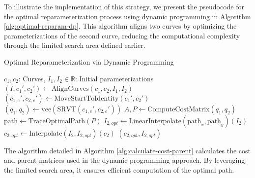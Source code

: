 To illustrate the implementation of this strategy, we present the pseudocode for the optimal reparameterization process using dynamic programming in Algorithm \ref{alg:optimal-reparam-dp}. This algorithm aligns two curves by optimizing the parameterizations of the second curve, reducing the computational complexity through the limited search area defined earlier.

\begin{algorithm}
    \caption{Optimal Reparameterization via Dynamic Programming}
    \label{alg:optimal-reparam-dp}
    \begin{algorithmic}[1]
    \Require $c_1, c_2$: Curves, $I_1, I_2 \in \mathbb{R}$: Initial parameterizations
        \State $(I, c_1', c_2') \gets \text{AlignCurves}(c_1, c_2, I_1, I_2)$
        \State $(c_{1,e}', c_{2,e}') \gets \text{MoveStartToIdentity}(c_1', c_2')$ \Comment{\eqref{eq:maurer-cartan-gl}}
        \State $(q_1, q_2) \gets \text{vee}(\text{SRVT}(c_{1,e}', c_{2,e}'))$ \Comment{\eqref{eq:srvt-discrete}, \eqref{eq:vee_SO3}, \eqref{eq:vee_SE3}}
        \State $A, P \gets \text{ComputeCostMatrix}(q_1, q_2)$  \Comment{\eqref{eq:cost-matrix}}
        \State $\text{path} \gets \text{TraceOptimalPath}(P)$ 
        \State $I_{2, opt} \gets \text{LinearInterpolate}(\text{path}_x, \text{path}_y)(I_2)$ 
        \State $c_{2, opt} \gets \text{Interpolate}(I_{2}, I_{2, opt})(c_2)$  \Comment{\eqref{eq:interpolation-discrete}}
        \State \Return $(c_{2, opt}, I_{2, opt})$
    \EndFunction
    \end{algorithmic}
\end{algorithm}

The algorithm detailed in Algorithm \ref{alg:calculate-cost-parent} calculates the cost and parent matrices used in the dynamic programming approach. By leveraging the limited search area, it ensures efficient computation of the optimal path.

